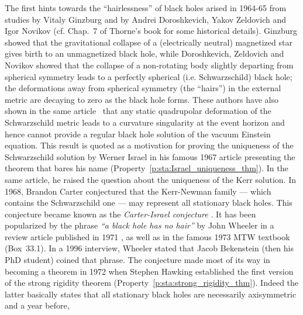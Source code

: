 \begin{hist}
The first hints towards the ``hairlessness'' of black holes arised in 1964-65 from
studies by Vitaly Ginzburg \cite{Ginzb64}
and by Andrei Doroshkevich, Yakov Zeldovich and Igor Novikov \cite{DorosZN65}
(cf.  Chap.~7 of Thorne's book \cite{Thorn94} for
some historical details).
Ginzburg showed that the gravitational collapse of a (electrically neutral) magnetized
star gives birth to an unmagnetized black hole, while
Doroshkevich, Zeldovich and Novikov showed
that the collapse of a non-rotating body slightly departing from spherical symmetry leads to a perfectly spherical (i.e. Schwarzschild) black hole;
the deformations away from spherical symmetry (the ``hairs'') in the external metric
are decaying to zero as the black hole forms. These authors have also shown in the same article~\cite{DorosZN65} that any static quadrupolar
deformation of the Schwarzschild metric leads to a curvature singularity at the event horizon and hence cannot provide a regular black hole
solution of the vacuum Einstein equation.
This result is quoted as a motivation for proving the uniqueness of the Schwarzschild
solution by Werner Israel
in his famous 1967 article \cite{Israe67} presenting the theorem that bares his name
(Property~\ref{p:sta:Israel_uniqueness_thm}). In the same article, he raised
the question about the uniqueness of the Kerr solution.
In 1968, Brandon Carter \cite{Carte68a}
conjectured that the Kerr-Newman family --- which contains the Schwarzschild one ---
may represent all stationary black holes.
This conjecture became known as the
\emph{Carter-Israel conjecture} \cite{Robin09,HawkiE73}.
It has been popularized by the phrase
\emph{``a black hole has no hair''} by
John Wheeler
in a review article published in 1971 \cite{RuffiW71},
as well as in the famous 1973 MTW textbook \cite{MisneTW73}
(Box~33.1). In a 1996 interview, Wheeler \cite{Wheel96} stated that Jacob Bekenstein (then his PhD student) coined that phrase.
The conjecture made most of its way in becoming a theorem in 1972 when Stephen Hawking \cite{Hawki72} established the first version of the strong rigidity theorem
(Property~\ref{p:sta:strong_rigidity_thm}). Indeed the latter basically states that all stationary black holes are necessarily axisymmetric and a year before,

\end{hist}
